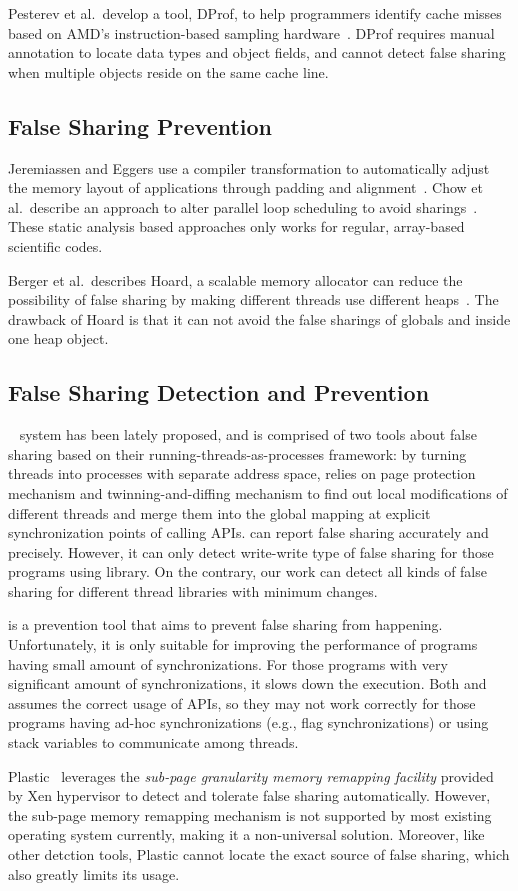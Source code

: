 Pesterev et al.\ develop a tool, DProf, to help programmers identify cache misses based on
AMD's instruction-based sampling hardware~\cite{DProf}.
DProf requires manual annotation
to locate data types and object fields, and cannot detect false
sharing when multiple objects reside on the same cache line.

\subsection{False Sharing Prevention}
Jeremiassen and Eggers use a compiler transformation to automatically adjust the
memory layout of applications through padding and alignment~\cite{falseshare:compile}.
Chow et al.\ describe an approach to alter parallel loop scheduling to avoid
sharings~\cite{falseshare:schedule}.
These static analysis based approaches only works for regular,
array-based scientific codes.

Berger et al.\ describes Hoard, a scalable memory allocator can reduce
the possibility of false sharing
by making different threads use different heaps~\cite{Hoard}.
The drawback of Hoard is that it can not avoid the false sharings of globals and inside one heap object.

\subsection{False Sharing Detection and Prevention}
\sheriff{}~\cite{sheriff} system has been lately proposed, and is comprised of two tools about false sharing based on 
their running-threads-as-processes framework: by turning threads into processes with separate address space, \sheriff{} relies on page protection mechanism and twinning-and-diffing mechanism 
to find out local modifications of different threads and merge them into the 
global mapping at explicit synchronization points of calling \pthreads{} APIs. 
\SheriffDetect{} can report false sharing accurately and precisely.
However, it can only detect write-write type of false sharing for those programs 
using \pthreads{} library. On the contrary, our work can detect all kinds of false sharing for different
thread libraries with minimum changes. 

 \SheriffProtect{} is a prevention tool that aims to prevent false sharing
 from happening. Unfortunately, it is only suitable for improving the performance of
programs having small amount of synchronizations. For those programs with very significant 
amount of synchronizations, it slows down the execution. 
Both \SheriffDetect{} and \SheriffProtect{} assumes the correct usage of \pthreads{} APIs,  
so they may not work correctly for those programs having ad-hoc
synchronizations (e.g., flag synchronizations) or using stack variables to communicate among threads.

Plastic~\cite{OSdetection} leverages the {\it sub-page granularity memory remapping facility}
provided by Xen hypervisor to detect and tolerate false sharing automatically.
However, the sub-page memory remapping mechanism is not supported by most existing operating 
system currently, making it a non-universal solution. Moreover, like other
detction tools, Plastic cannot locate the exact source of false sharing, which also greatly limits its usage.
